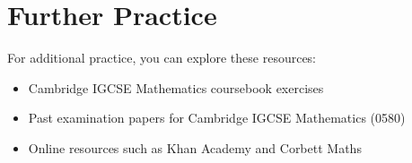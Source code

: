 \documentclass{article}
\begin{document}
\section{Further Practice}

For additional practice, you can explore these resources:
\begin{itemize}
    \item Cambridge IGCSE Mathematics coursebook exercises
    \item Past examination papers for Cambridge IGCSE Mathematics (0580)
    \item Online resources such as Khan Academy and Corbett Maths
\end{itemize}
\end{document}

